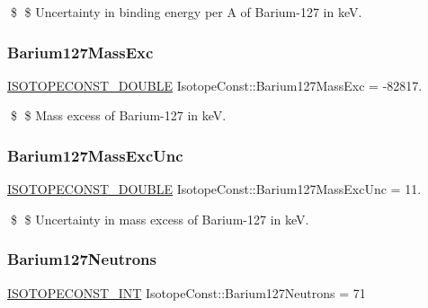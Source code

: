 \$ \$ Uncertainty in binding energy per A of Barium-\/127 in keV. \mbox{\label{group___isotope_const-_barium-_ba127_ga892b2b0622a9736ee9ee10c21660345b}} 
\subsubsection{\texorpdfstring{Barium127\+Mass\+Exc}{Barium127MassExc}}
{\footnotesize\ttfamily \mbox{\hyperlink{group___isotope_const-_macros_ga8f45a7272ce02c0b4c65c44636ed719a}{I\+S\+O\+T\+O\+P\+E\+C\+O\+N\+S\+T\+\_\+\+D\+O\+U\+B\+LE}} Isotope\+Const\+::\+Barium127\+Mass\+Exc = -\/82817.}

\$ \$ Mass excess of Barium-\/127 in keV. \mbox{\label{group___isotope_const-_barium-_ba127_ga19590c3e374d5c7e7814909561ad9cf5}} 
\subsubsection{\texorpdfstring{Barium127\+Mass\+Exc\+Unc}{Barium127MassExcUnc}}
{\footnotesize\ttfamily \mbox{\hyperlink{group___isotope_const-_macros_ga8f45a7272ce02c0b4c65c44636ed719a}{I\+S\+O\+T\+O\+P\+E\+C\+O\+N\+S\+T\+\_\+\+D\+O\+U\+B\+LE}} Isotope\+Const\+::\+Barium127\+Mass\+Exc\+Unc = 11.}

\$ \$ Uncertainty in mass excess of Barium-\/127 in keV. \mbox{\label{group___isotope_const-_barium-_ba127_gaa449dedf7f975388449f726339c03db5}} 
\subsubsection{\texorpdfstring{Barium127\+Neutrons}{Barium127Neutrons}}
{\footnotesize\ttfamily \mbox{\hyperlink{group___isotope_const-_macros_ga5f18360b3e99483a35c32d789e62621c}{I\+S\+O\+T\+O\+P\+E\+C\+O\+N\+S\+T\+\_\+\+I\+NT}} Isotope\+Const\+::\+Barium127\+Neutrons = 71}

